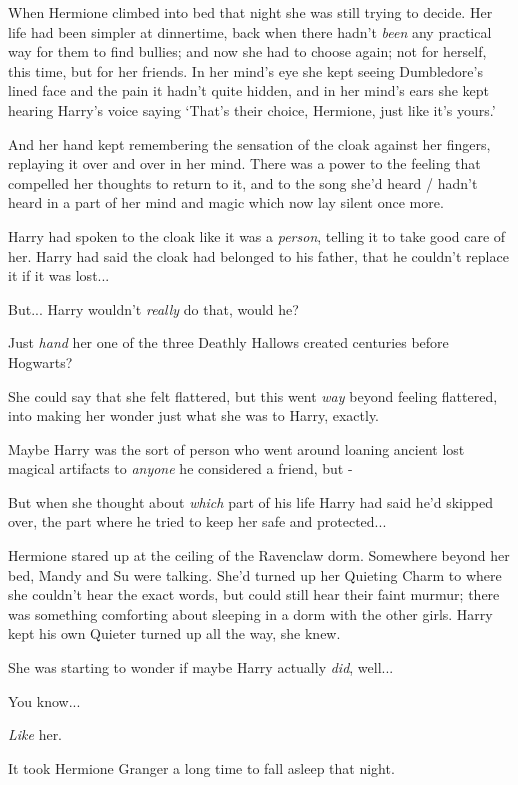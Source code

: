 When Hermione climbed into bed that night she was still trying to decide. Her life had been simpler at dinnertime, back when there hadn't \emph{been} any practical way for them to find bullies; and now she had to choose again; not for herself, this time, but for her friends. In her mind's eye she kept seeing Dumbledore's lined face and the pain it hadn't quite hidden, and in her mind's ears she kept hearing Harry's voice saying `That's their choice, Hermione, just like it's yours.'

And her hand kept remembering the sensation of the cloak against her fingers, replaying it over and over in her mind. There was a power to the feeling that compelled her thoughts to return to it, and to the song she'd heard / hadn't heard in a part of her mind and magic which now lay silent once more.

Harry had spoken to the cloak like it was a \emph{person}, telling it to take good care of her. Harry had said the cloak had belonged to his father, that he couldn't replace it if it was lost...

But... Harry wouldn't \emph{really} do that, would he?

Just \emph{hand} her one of the three Deathly Hallows created centuries before Hogwarts?

She could say that she felt flattered, but this went \emph{way} beyond feeling flattered, into making her wonder just what she was to Harry, exactly.

Maybe Harry was the sort of person who went around loaning ancient lost magical artifacts to \emph{anyone} he considered a friend, but -

But when she thought about \emph{which} part of his life Harry had said he'd skipped over, the part where he tried to keep her safe and protected...

Hermione stared up at the ceiling of the Ravenclaw dorm. Somewhere beyond her bed, Mandy and Su were talking. She'd turned up her Quieting Charm to where she couldn't hear the exact words, but could still hear their faint murmur; there was something comforting about sleeping in a dorm with the other girls. Harry kept his own Quieter turned up all the way, she knew.

She was starting to wonder if maybe Harry actually \emph{did}, well...

You know...

\emph{Like} her.

It took Hermione Granger a long time to fall asleep that night.

